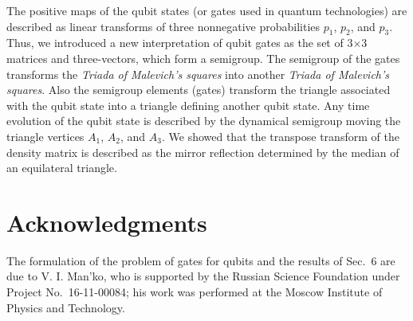 \documentclass[12pt]{article}
\begin{document}
The positive maps of the qubit states (or gates used in quantum
technologies) are described as linear transforms of three
nonnegative probabilities $p_1$, $p_2$, and $p_3$. Thus, we
introduced a new interpretation of qubit gates as the set of
3$\times$3 matrices and three-vectors, which form a semigroup. The
semigroup of the gates transforms the {\it Triada of Malevich's
squares} into another {\it Triada of Malevich's squares}. Also the
semigroup elements (gates) transform the triangle associated with
the qubit state into a triangle defining another qubit state. Any
time evolution of the qubit state is described by the dynamical
semigroup moving the triangle vertices $A_1$, $A_2$, and $A_3$. We
showed that the transpose transform of the density matrix is
described as the mirror reflection determined by the median of an
equilateral triangle.%

\section*{Acknowledgments}      
The formulation of the problem of gates for qubits and the results
of Sec.~6 are due to V. I. Man'ko, who is supported by the Russian
Science Foundation under Project No.~16-11-00084; his work was
performed at the Moscow Institute of Physics and Technology.%
\end{document}

